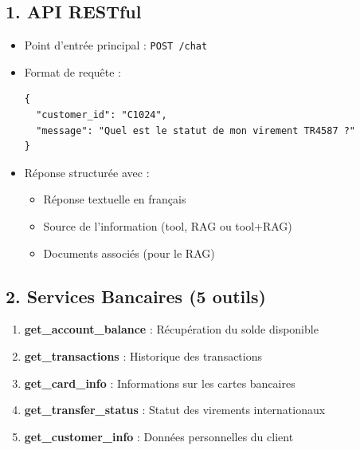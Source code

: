 \documentclass[12pt,a4paper]{article}
\begin{document}
\subsection*{1. API RESTful}
\begin{itemize}
    \item Point d'entrée principal : \texttt{POST /chat}
    \item Format de requête :
    \begin{verbatim}
{
  "customer_id": "C1024",
  "message": "Quel est le statut de mon virement TR4587 ?"
}
    \end{verbatim}
    \item Réponse structurée avec :
    \begin{itemize}
        \item Réponse textuelle en français
        \item Source de l'information (tool, RAG ou tool+RAG)
        \item Documents associés (pour le RAG)
    \end{itemize}
\end{itemize}

\subsection*{2. Services Bancaires (5 outils)}
\begin{enumerate}
    \item \textbf{get\_account\_balance} : Récupération du solde disponible
    \item \textbf{get\_transactions} : Historique des transactions
    \item \textbf{get\_card\_info} : Informations sur les cartes bancaires
    \item \textbf{get\_transfer\_status} : Statut des virements internationaux
    \item \textbf{get\_customer\_info} : Données personnelles du client
\end{enumerate}
\end{document}
